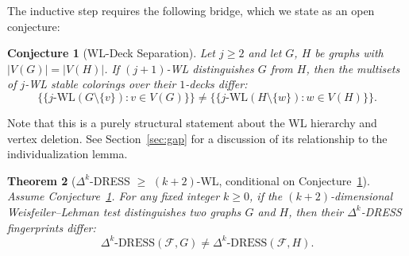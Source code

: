 \documentclass[11pt,a4paper]{article}
\newtheorem{theorem}{Theorem}
\newtheorem{conjecture}[theorem]{Conjecture}
\begin{document}
The inductive step requires the following bridge, which we state as an open conjecture:

\begin{conjecture}[WL-Deck Separation]
\label{conj:wl-deck}
Let $j \geq 2$ and let $G$, $H$ be graphs with $|V(G)| = |V(H)|$. If $(j+1)$-WL distinguishes $G$ from $H$, then the multisets of $j$-WL stable colorings over their $1$-decks differ:
\[
\{\!\{ j\text{-WL}(G \setminus \{v\}) : v \in V(G) \}\!\} \neq \{\!\{ j\text{-WL}(H \setminus \{w\}) : w \in V(H) \}\!\}.
\]
\end{conjecture}

Note that this is a purely structural statement about the WL hierarchy and vertex deletion. See Section~\ref{sec:gap} for a discussion of its relationship to the individualization lemma.

\begin{theorem}[$\Delta^k$-DRESS $\geq$ $(k+2)$-WL, conditional on Conjecture~\ref{conj:wl-deck}]
\label{thm:delta-k-wl}
Assume Conjecture~\ref{conj:wl-deck}. For any fixed integer $k\geq 0$, if the $(k+2)$-dimensional Weisfeiler--Lehman test distinguishes two graphs $G$ and $H$, then their $\Delta^k$-DRESS fingerprints differ:
\[
\Delta^k\text{-DRESS}(\mathcal{F}, G) \neq \Delta^k\text{-DRESS}(\mathcal{F}, H).
\]
\end{theorem}
\end{document}
